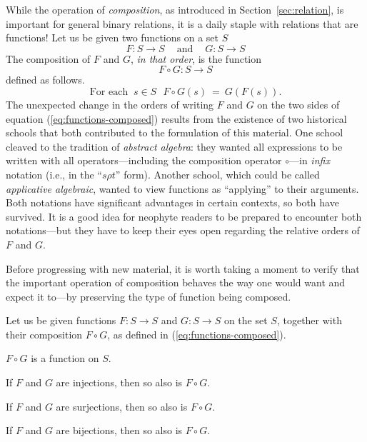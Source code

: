  
While the operation of {\it composition}, as introduced in
Section~\ref{sec:relation}, is important for general binary relations,
it is a daily staple with relations that are functions!  Let us be
given two functions on a set $S$
\[
F: S \rightarrow S \ \ \ \ \mbox{ and } \ \ \ \ G: S \rightarrow S
\]
The composition of $F$ and $G$, {\em in that order}, is the function
\[ F \circ G: S \rightarrow S \]
defined as follows.
\begin{equation}
\label{eq:functions-composed}
\mbox{For each } \ s \in S \ \ \
F \circ G(s) \ = \ G(F(s)).
\end{equation}
The unexpected change in the orders of writing $F$ and $G$ on the two
sides of equation (\ref{eq:functions-composed}) results from the
existence of two historical schools that both contributed to the
formulation of this material.
One school cleaved to the tradition of {\it abstract algebra}:  they
wanted all expressions to be written with all operators---including
the composition operator $\circ$---in {\em infix} notation (i.e., in
the ``$s \rho t$'' form).  Another school, which could be called {\it
  applicative algebraic}, wanted to view functions as ``applying'' to
their arguments.  Both notations have significant advantages in
certain contexts, so both have survived.  It is a good idea for
neophyte readers to be prepared to encounter both notations---but they
have to keep their eyes open regarding the relative orders of $F$ and
$G$.

\medskip

Before progressing with new material, it is worth taking a moment to
verify that the important operation of composition behaves the way one
would want and expect it to---by preserving the type of function being
composed.

\begin{prop}
\label{thm:fn-composition}
Let us be given functions $F: S \rightarrow S$ and $G: S \rightarrow
S$ on the set $S$, together with their composition $F \circ G$, as
defined in (\ref{eq:functions-composed}).

$F \circ G$ is a function on $S$.

If $F$ and $G$ are injections, then so also is $F \circ G$.

If $F$ and $G$ are surjections, then so also is $F \circ G$.

If $F$ and $G$ are bijections, then so also is $F \circ G$.
\end{prop}

